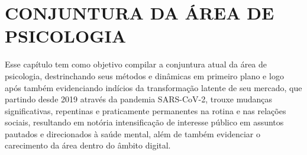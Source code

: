 \chapter{CONJUNTURA DA ÁREA DE PSICOLOGIA}
\label{chap:conjunturaPsicologia}

Esse capítulo tem como objetivo compilar a conjuntura atual da área de psicologia, destrinchando seus métodos e dinâmicas em primeiro plano e logo após também  evidenciando indícios da transformação latente de seu mercado, que partindo desde 2019 através da pandemia SARS-CoV-2, trouxe mudanças significativas, repentinas e praticamente permanentes na rotina e nas relações sociais, resultando em notória intensificação de interesse público em assuntos pautados e direcionados à saúde mental, além de também evidenciar o carecimento da área dentro do âmbito digital.





